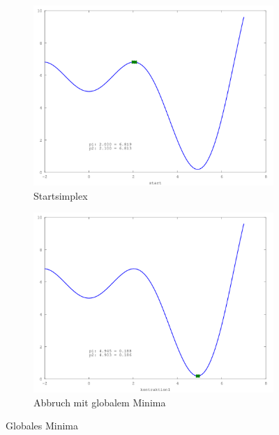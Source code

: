 \begin{figure}[htb]
\centering
\begin{subfigure}[b]{0.49\textwidth}
\centering
\includegraphics[width=\textwidth]{downhill/glob_sinx_x001.png}
\caption{Startsimplex}
\end{subfigure} \begin{subfigure}[b]{0.49\textwidth}
\centering
\includegraphics[width=\textwidth]{downhill/glob_sinx_x010.png}
\caption{Abbruch mit globalem Minima}
\end{subfigure}
\caption{Globales Minima}
\label{fig:downhillGlobMinima}
\end{figure}


